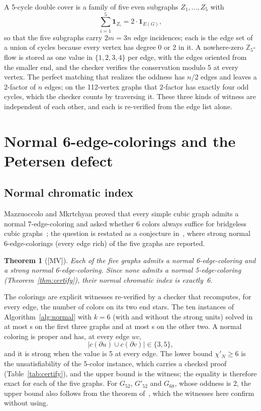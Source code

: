 \documentclass[11pt]{article}
\newtheorem{theorem}{Theorem}[section]
\theoremstyle{definition}
\theoremstyle{remark}
\newcommand{\Gfty}{G_{52}}
\newcommand{\Gftyb}{G'_{52}}
\newcommand{\Gsix}{G_{68}}
\newcommand{\mv}{\textup{[MV]}}
\begin{document}
A 5-cycle double cover is a family of five even subgraphs $Z_1,\dots,Z_5$ with
\begin{equation}\label{eq:cdc}
\sum_{i=1}^{5} \mathbf 1_{Z_i} = 2\cdot \mathbf 1_{E(G)},
\end{equation}
so that the five subgraphs carry $2m = 3n$ edge incidences; each is the edge set of a union of cycles
because every vertex has degree 0 or 2 in it. A nowhere-zero $\mathbb Z_5$-flow is stored as one value
in $\{1,2,3,4\}$ per edge, with the edges oriented from the smaller end, and the checker verifies the
conservation modulo 5 at every vertex. The perfect matching that realizes the oddness has $n/2$ edges
and leaves a 2-factor of $n$ edges; on the 112-vertex graphs that 2-factor has exactly four odd
cycles, which the checker counts by traversing it. These three kinds of witness are independent of
each other, and each is re-verified from the edge list alone.

\section{Normal 6-edge-colorings and the Petersen defect}\label{sec:normal}

\subsection{Normal chromatic index}

Mazzuoccolo and Mkrtchyan proved that every simple cubic graph admits a normal 7-edge-coloring
and asked whether 6 colors always suffice for bridgeless cubic graphs~\cite{MazzMkrt2020}; the
question is restated as a conjecture in~\cite{GJMMM2026, GJMMMU2026}, where strong normal
6-edge-colorings (every edge rich) of the five graphs are reported.

\begin{theorem}[\mv]\label{thm:normal6}
Each of the five graphs admits a normal 6-edge-coloring and a strong normal
6-edge-coloring. Since none admits a normal 5-edge-coloring (Theorem~\ref{thm:certify}), their
normal chromatic index is exactly~6.
\end{theorem}

The colorings are explicit witnesses re-verified by a checker that recomputes, for every edge,
the number of colors on its two end stars. The ten instances of Algorithm~\ref{alg:normal} with $k = 6$
(with and without the strong units) solved in at most \NsixMaxA{} s on the first three graphs and at
most \NsixMaxB{} s on the other two. A normal coloring is proper and has, at every edge $uv$,
\begin{equation}\label{eq:normal}
\bigl|c(\partial u) \cup c(\partial v)\bigr| \in \{3, 5\},
\end{equation}
and it is strong when the value is 5 at every edge. The lower bound $\chi'_N \ge 6$ is the
unsatisfiability of the 5-color instance, which carries a checked proof (Table~\ref{tab:certify}), and
the upper bound is the witness; the equality is therefore exact for each of the five graphs. For
$\Gfty$, $\Gftyb$ and $\Gsix$, whose oddness is 2, the upper bound also follows from the theorem
of~\cite{FLSS2025}, which the witnesses here confirm without using.
\end{document}
